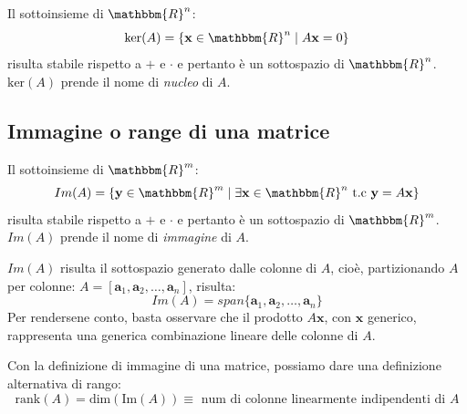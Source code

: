 \documentclass[12pt]{report}
\begin{document}
Il sottoinsieme di $\mathbbm{R}^n$:
\[
\text{ker}(A) = \{\mathbf{x} \in \mathbbm{R}^n \mid A\mathbf{x} = 0\}
\]
risulta stabile rispetto a $+$ e $\cdot$ e pertanto è un sottospazio di $\mathbbm{R}^n$. $\text{ker}(A)$ prende il nome di \textit{nucleo} di $A$.
\subsection{Immagine o range di una matrice}
Il sottoinsieme di $\mathbbm{R}^m$:
\[
Im(A) = \{\mathbf{y} \in \mathbbm{R}^m \mid \exists \mathbf{x} \in \mathbbm{R}^n \text{ t.c } \mathbf{y} = A\mathbf{x}\}
\]
risulta stabile rispetto a $+$ e $\cdot$ e pertanto è un sottospazio di $\mathbbm{R}^m$. $Im(A)$ prende il nome di \textit{immagine} di $A$.
\begin{note}{}{}
$Im(A)$ risulta il sottospazio generato dalle colonne di $A$, cioè, partizionando $A$ per colonne: $A = [\mathbf{a}_1, \mathbf{a}_2, \dots, \mathbf{a}_n]$, risulta:
\[
Im(A) = span\{\mathbf{a}_1, \mathbf{a}_2, \dots, \mathbf{a}_n\}
\]
Per rendersene conto, basta osservare che il prodotto $A\mathbf{x}$, con $\mathbf{x}$ generico, rappresenta una generica combinazione lineare delle colonne di $A$.
\end{note}

Con la definizione di immagine di una matrice, possiamo dare una definizione alternativa di rango:
\[
\text{rank}(A) = \text{dim}(\text{Im}(A)) \equiv \text{ num di colonne linearmente indipendenti di $A$}
\]
\end{document}
